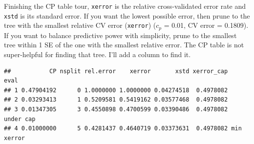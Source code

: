 \documentclass[
]{book}
\newenvironment{Shaded}{\begin{snugshade}}{\end{snugshade}}
\newcommand{\DataTypeTok}[1]{\textcolor[rgb]{0.13,0.29,0.53}{#1}}
\newcommand{\DecValTok}[1]{\textcolor[rgb]{0.00,0.00,0.81}{#1}}
\newcommand{\KeywordTok}[1]{\textcolor[rgb]{0.13,0.29,0.53}{\textbf{#1}}}
\newcommand{\NormalTok}[1]{#1}
\newcommand{\OperatorTok}[1]{\textcolor[rgb]{0.81,0.36,0.00}{\textbf{#1}}}
\newcommand{\OtherTok}[1]{\textcolor[rgb]{0.56,0.35,0.01}{#1}}
\newcommand{\StringTok}[1]{\textcolor[rgb]{0.31,0.60,0.02}{#1}}
\begin{document}
Finishing the CP table tour, \texttt{xerror} is the relative cross-validated error rate and \texttt{xstd} is its standard error. If you want the lowest possible error, then prune to the tree with the smallest relative CV error (\texttt{xerror}) (\(c_p\) = 0.01, CV error = 0.1809). If you want to balance predictive power with simplicity, prune to the smallest tree within 1 SE of the one with the smallest relative error. The CP table is not super-helpful for finding that tree. I'll add a column to find it.

\begin{Shaded}
\end{Shaded}

\begin{verbatim}
##           CP nsplit rel.error    xerror       xstd xerror_cap       eval
## 1 0.47904192      0 1.0000000 1.0000000 0.04274518  0.4978082           
## 2 0.03293413      1 0.5209581 0.5419162 0.03577468  0.4978082           
## 3 0.01347305      3 0.4550898 0.4700599 0.03390486  0.4978082  under cap
## 4 0.01000000      5 0.4281437 0.4640719 0.03373631  0.4978082 min xerror
\end{verbatim}
\end{document}
